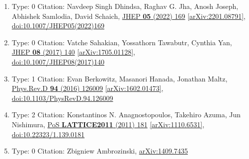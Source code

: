 \documentclass[a4paper,10pt]{article}
\begin{document}
\begin{enumerate}
\begin{enumerate}
  \item Type: 0 Citation: Navdeep Singh Dhindsa, Raghav G. Jha, Anosh Joseph, Abhishek Samlodia, David Schaich, \href{https://www.doi.org/10.1007/JHEP05(2022)169}{JHEP {\bf 05} (2022) 169}  \href{https://arxiv.org/abs/2201.08791}{[arXiv:2201.08791]},\\\href{https://www.doi.org/10.1007/JHEP05(2022)169}{doi:10.1007/JHEP05(2022)169}
  \item Type: 0 Citation: Vatche Sahakian, Yossathorn Tawabutr, Cynthia Yan, \href{https://www.doi.org/10.1007/JHEP08(2017)140}{JHEP {\bf 08} (2017) 140}  \href{https://arxiv.org/abs/1705.01128}{[arXiv:1705.01128]},\\\href{https://www.doi.org/10.1007/JHEP08(2017)140}{doi:10.1007/JHEP08(2017)140}
  \item Type: 1 Citation: Evan Berkowitz, Masanori Hanada, Jonathan Maltz, \href{https://www.doi.org/10.1103/PhysRevD.94.126009}{Phys.Rev.D {\bf 94} (2016) 126009}  \href{https://arxiv.org/abs/1602.01473}{[arXiv:1602.01473]},\\\href{https://www.doi.org/10.1103/PhysRevD.94.126009}{doi:10.1103/PhysRevD.94.126009}
  \item Type: 2 Citation: Konstantinos N. Anagnostopoulos, Takehiro Azuma, Jun Nishimura, \href{https://www.doi.org/10.22323/1.139.0181}{PoS {\bf LATTICE2011} (2011) 181}  \href{https://arxiv.org/abs/1110.6531}{[arXiv:1110.6531]},\\\href{https://www.doi.org/10.22323/1.139.0181}{doi:10.22323/1.139.0181}
  \item Type: 0 Citation: Zbigniew Ambrozinski, \href{https://arxiv.org/abs/1409.7435}{arXiv:1409.7435}

\end{enumerate}
\end{enumerate}
\end{document}
